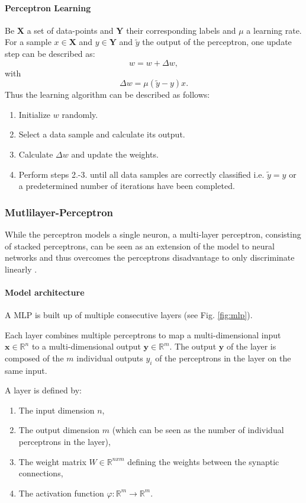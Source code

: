 \paragraph{Perceptron Learning} \label{c:perlearning}

Be $\textbf{X}$ a set of data-points and $\textbf{Y}$ their corresponding labels and $\mu$ a learning rate. 
For a sample $x \in \textbf{X}$  and $y \in \textbf{Y}$ and $\tilde{y}$ the output of the perceptron, one update step can be described as:
\[ 
	w = w + \Delta w,
\]
with 
\[
	\Delta w = \mu (\tilde{y}-y) x .
\]
Thus the learning algorithm can be described as follows:

\begin{enumerate}
	\item Initialize $w$ randomly.
	\item Select a data sample and calculate its output.
	\item Calculate $\Delta w$ and update the weights.
	\item Perform steps 2.-3. until all data samples are correctly classified i.e. $\tilde{y} = y$ or a predetermined number of iterations have been completed.
\end{enumerate}


\subsubsection{Mutlilayer-Perceptron} \label{c:mlp}

While the perceptron models a single neuron, a multi-layer perceptron, consisting of stacked perceptrons, can be seen as an extension of the model to neural networks and thus overcomes the perceptrons disadvantage to only discriminate linearly \cite{rumelhart1985learning}\cite{Goodfellow-et-al-2016-Book}. 

\paragraph{Model architecture} \label{c:mlparch}

A MLP is built up of multiple consecutive layers (see Fig. \ref{fig:mlp}).

Each layer combines multiple perceptrons to map a multi-dimensional input $\textbf{x} \in \mathbb{R}^n$ to a multi-dimensional output $\textbf{y} \in \mathbb{R}^m$.
The output $\textbf{y}$ of the layer is composed of the $m$ individual outputs $y_i$ of the perceptrons in the layer on the same input.


A layer is defined by:
\begin{enumerate}
	\item The input dimension $n$,
	\item The output dimension $m$ (which can be seen as the number of individual perceptrons in the layer),
	\item The weight matrix $W \in \mathbb{R}^{nxm} $ defining the weights between the synaptic connections,
	\item The activation function $\varphi : \mathbb{R}^m \rightarrow \mathbb{R}^m $.
\end{enumerate}

